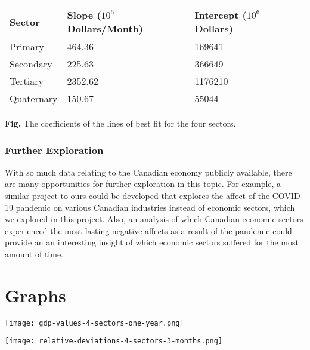 \documentclass[fontsize=11pt]{article}
\begin{document}
\medskip

    \begin{tabular}{|l|l|l|l|}
    \hline
    Sector & Slope ($10^6$ Dollars/Month) & Intercept ($10^6$ Dollars)\\
    \hline
    Primary & 464.36 & 169641\\
    Secondary & 225.63 & 366649\\
    Tertiary & 2352.62 & 1176210\\
    Quaternary & 150.67 & 55044\\
    \hline
    \end{tabular}

\medskip

\textbf{Fig.} The coefficients of the lines of best fit for the four sectors.

\subsubsection*{Further Exploration}

With so much data relating to the Canadian economy publicly available, there are many opportunities for further exploration in this topic. For example, a similar project to ours could be developed that explores the affect of the COVID-19 pandemic on various Canadian industries instead of economic sectors, which we explored in this project. Also, an analysis of which Canadian economic sectors experienced the most lasting negative affects as a result of the pandemic could provide an an interesting insight of which economic sectors suffered for the most amount of time.  


\section*{Graphs}

\begin{center}
\texttt{[image: gdp-values-4-sectors-one-year.png]}
\end{center}


\begin{center}
\texttt{[image: relative-deviations-4-sectors-3-months.png]}
\end{center}

\newpage
\end{document}
